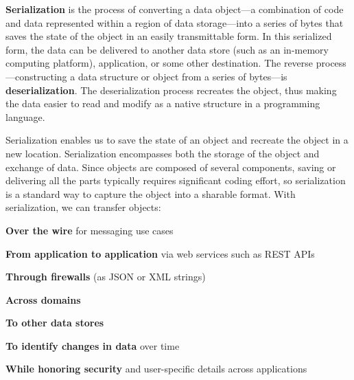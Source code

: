 \documentclass[../report.tex]{subfiles}
\begin{document}
\textbf{Serialization} is the process of converting a data object—a combination of code and data represented within a region of data storage—into a series of bytes that saves the state of the object in an easily transmittable form. In this serialized form, the data can be delivered to another data store (such as an in-memory computing platform), application, or some other destination. The reverse process—constructing a data structure or object from a series of bytes—is \textbf{deserialization}. The deserialization process recreates the object, thus making the data easier to read and modify as a native structure in a programming language.

Serialization enables us to save the state of an object and recreate the object in a new location. Serialization encompasses both the storage of the object and exchange of data. Since objects are composed of several components, saving or delivering all the parts typically requires significant coding effort, so serialization is a standard way to capture the object into a sharable format. With serialization, we can transfer objects:

\textbf{Over the wire} for messaging use cases

\textbf{From application to application} via web services such as REST APIs

\textbf{Through firewalls} (as JSON or XML strings)

\textbf{Across domains}

\textbf{To other data stores}

\textbf{To identify changes in data} over time

\textbf{While honoring security} and user-specific details across applications
\end{document}
